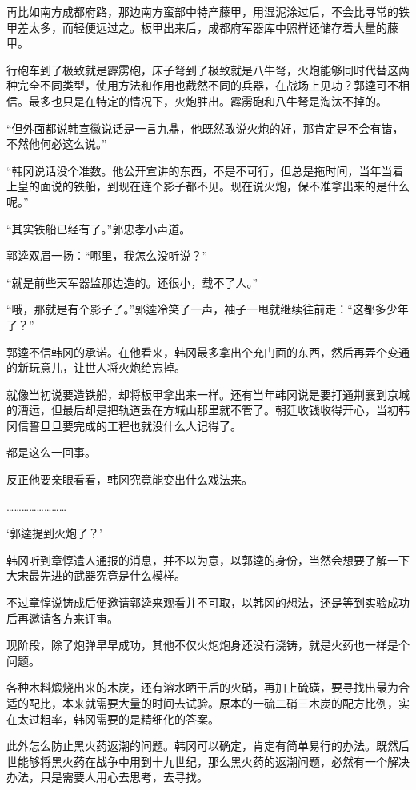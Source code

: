 再比如南方成都府路，那边南方蛮部中特产藤甲，用湿泥涂过后，不会比寻常的铁甲差太多，而轻便远过之。板甲出来后，成都府军器库中照样还储存着大量的藤甲。

行砲车到了极致就是霹雳砲，床子弩到了极致就是八牛弩，火炮能够同时代替这两种完全不同类型，使用方法和作用也截然不同的兵器，在战场上见功？郭逵可不相信。最多也只是在特定的情况下，火炮胜出。霹雳砲和八牛弩是淘汰不掉的。

“但外面都说韩宣徽说话是一言九鼎，他既然敢说火炮的好，那肯定是不会有错，不然他何必这么说。”

“韩冈说话没个准数。他公开宣讲的东西，不是不可行，但总是拖时间，当年当着上皇的面说的铁船，到现在连个影子都不见。现在说火炮，保不准拿出来的是什么呢。”

“其实铁船已经有了。”郭忠孝小声道。

郭逵双眉一扬：“哪里，我怎么没听说？”

“就是前些天军器监那边造的。还很小，载不了人。”

“哦，那就是有个影子了。”郭逵冷笑了一声，袖子一甩就继续往前走：“这都多少年了？”

郭逵不信韩冈的承诺。在他看来，韩冈最多拿出个充门面的东西，然后再弄个变通的新玩意儿，让世人将火炮给忘掉。

就像当初说要造铁船，却将板甲拿出来一样。还有当年韩冈说是要打通荆襄到京城的漕运，但最后却是把轨道丢在方城山那里就不管了。朝廷收钱收得开心，当初韩冈信誓旦旦要完成的工程也就没什么人记得了。

都是这么一回事。

反正他要亲眼看看，韩冈究竟能变出什么戏法来。

……………………

‘郭逵提到火炮了？’

韩冈听到章惇遣人通报的消息，并不以为意，以郭逵的身份，当然会想要了解一下大宋最先进的武器究竟是什么模样。

不过章惇说铸成后便邀请郭逵来观看并不可取，以韩冈的想法，还是等到实验成功后再邀请各方来评审。

现阶段，除了炮弹早早成功，其他不仅火炮炮身还没有浇铸，就是火药也一样是个问题。

各种木料煅烧出来的木炭，还有溶水晒干后的火硝，再加上硫磺，要寻找出最为合适的配比，本来就需要大量的时间去试验。原本的一硫二硝三木炭的配方比例，实在太过粗率，韩冈需要的是精细化的答案。

此外怎么防止黑火药返潮的问题。韩冈可以确定，肯定有简单易行的办法。既然后世能够将黑火药在战争中用到十九世纪，那么黑火药的返潮问题，必然有一个解决办法，只是需要人用心去思考，去寻找。

